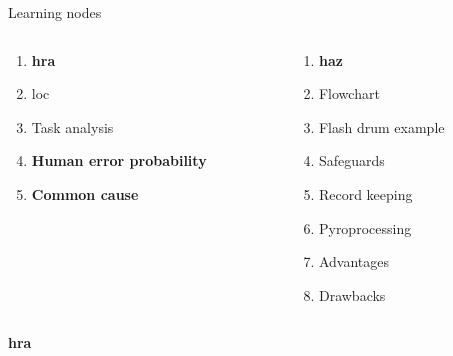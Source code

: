 \documentclass[aspectratio=1610,pdftex,dvipsnames,compress,xcolor={dvipsnames}]{beamer}
\newcommand{\acf}{\acrfull} %
\newcommand{\acl}{\acrlong} %
\newcommand{\acs}{\acrshort} %
\begin{document}
\begin{frame}{Learning nodes}
    \begin{columns}[t]

        \begin{column}{0.50\textwidth}
            \begin{enumerate}[series=outerlist,topsep=0pt,itemsep=1pt,leftmargin=*,label=(\arabic*)]
                \item[]\textbf{\acl{hra}}
                \item[]\acs{loc}
                \item[]Task analysis
                    \vspace{0.25in}
                \item[]\textbf{Human error probability}
                    \vspace{0.25in}
                \item[]\textbf{Common cause}
            \end{enumerate}
        \end{column}

        \begin{column}{0.50\textwidth}
            \begin{enumerate}[series=outerlist,topsep=0pt,itemsep=1pt,leftmargin=*,label=(\arabic*)]
                \item[]\hfill\textbf{\acs{haz}}
                \item[]\hfill Flowchart
                \item[]\hfill Flash drum example  
                \item[]\hfill Safeguards  
                \item[]\hfill Record keeping
                \item[]\hfill Pyroprocessing 
                \item[]\hfill Advantages
                \item[]\hfill Drawbacks
            \end{enumerate}
        \end{column}

    \end{columns}
\end{frame}


\begin{frame}[plain]{}
    \centering\LARGE\textbf{\acf{hra}}
\end{frame}
\end{document}
